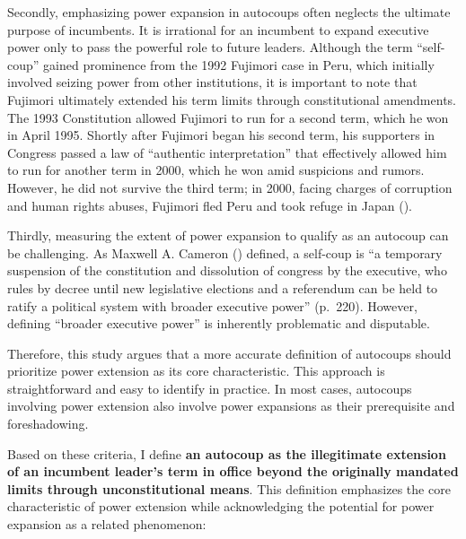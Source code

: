 \documentclass[
  12pt,
]{report}
\begin{document}
Secondly, emphasizing power expansion in autocoups often neglects the
ultimate purpose of incumbents. It is irrational for an incumbent to
expand executive power only to pass the powerful role to future leaders.
Although the term ``self-coup'' gained prominence from the 1992 Fujimori
case in Peru, which initially involved seizing power from other
institutions, it is important to note that Fujimori ultimately extended
his term limits through constitutional amendments. The 1993 Constitution
allowed Fujimori to run for a second term, which he won in April 1995.
Shortly after Fujimori began his second term, his supporters in Congress
passed a law of ``authentic interpretation'' that effectively allowed
him to run for another term in 2000, which he won amid suspicions and
rumors. However, he did not survive the third term; in 2000, facing
charges of corruption and human rights abuses, Fujimori fled Peru and
took refuge in Japan ().

Thirdly, measuring the extent of power expansion to qualify as an
autocoup can be challenging. As Maxwell A. Cameron
() defined, a self-coup is ``a
temporary suspension of the constitution and dissolution of congress by
the executive, who rules by decree until new legislative elections and a
referendum can be held to ratify a political system with broader
executive power'' (p.~220). However, defining ``broader executive
power'' is inherently problematic and disputable.

Therefore, this study argues that a more accurate definition of
autocoups should prioritize power extension as its core characteristic.
This approach is straightforward and easy to identify in practice. In
most cases, autocoups involving power extension also involve power
expansions as their prerequisite and foreshadowing.

Based on these criteria, I define \textbf{an autocoup as the
illegitimate extension of an incumbent leader's term in office beyond
the originally mandated limits through unconstitutional means}. This
definition emphasizes the core characteristic of power extension while
acknowledging the potential for power expansion as a related phenomenon:
\end{document}
